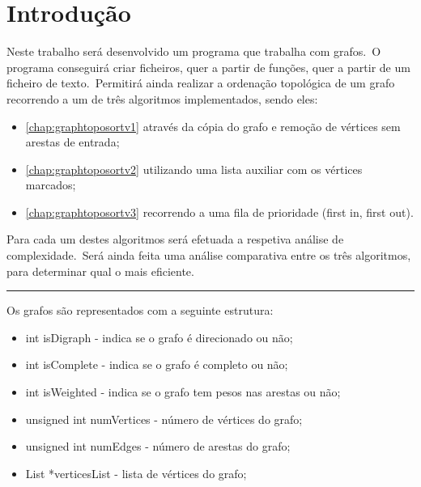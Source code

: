 
\chapter{Introdução}
\label{ch:introducao}

Neste trabalho será desenvolvido um programa que trabalha com grafos.\ O programa conseguirá criar ficheiros, quer a partir de funções, quer a partir de um ficheiro de texto.\ Permitirá ainda realizar a ordenação topológica de um grafo recorrendo a um de três algoritmos implementados, sendo eles:

\begin{itemize}
    \item \ref{chap:graphtoposortv1} através da cópia do grafo e remoção de vértices sem arestas de entrada;
    \item \ref{chap:graphtoposortv2} utilizando uma lista auxiliar com os vértices marcados;
    \item \ref{chap:graphtoposortv3} recorrendo a uma fila de prioridade (first in, first out).
\end{itemize}

Para cada um destes algoritmos será efetuada a respetiva análise de complexidade.\ Será ainda feita uma análise comparativa entre os três algoritmos, para determinar qual o mais eficiente.

\vspace*{5mm}
\rule{.95\textwidth}{0.2pt}
\vspace*{5mm}

Os grafos são representados com a seguinte estrutura:

\begin{itemize}
    \item int isDigraph - indica se o grafo é direcionado ou não;
    \item int isComplete - indica se o grafo é completo ou não;
    \item int isWeighted - indica se o grafo tem pesos nas arestas ou não;
    \item unsigned int numVertices - número de vértices do grafo;
    \item unsigned int numEdges - número de arestas do grafo;
    \item List *verticesList - lista de vértices do grafo;
\end{itemize}

\vspace*{5mm}

